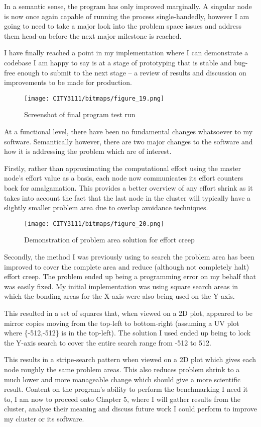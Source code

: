 In a semantic sense, the program has only improved marginally. A singular node is now once again capable of running the process single-handedly, however I am going to need to take a major look into the problem space issues and address them head-on before the next major milestone is reached.

\textbf{}

I have finally reached a point in my implementation where I can demonstrate a codebase I am happy to say is at a stage of prototyping that is stable and bug-free enough to submit to the next stage -- a review of results and discussion on improvements to be made for production.

\begin{figure}[H]
    \texttt{[image: CITY3111/bitmaps/figure\_19.png]}
    \caption{Screenshot of final program test run}
    \label{figure_19}
\end{figure}

At a functional level, there have been no fundamental changes whatsoever to my software. Semantically however, there are two major changes to the software and how it is addressing the problem which are of interest.

Firstly, rather than approximating the computational effort using the master node's effort value as a basis, each node now communicates its effort counters back for amalgamation. This provides a better overview of any effort shrink as it takes into account the fact that the last node in the cluster will typically have a slightly smaller problem area due to overlap avoidance techniques.

\begin{figure}[H]
    \texttt{[image: CITY3111/bitmaps/figure\_20.png]}
    \caption{Demonstration of problem area solution for effort creep}
    \label{figure_20}
\end{figure}

Secondly, the method I was previously using to search the problem area has been improved to cover the complete area and reduce (although not completely halt) effort creep. The problem ended up being a programming error on my behalf that was easily fixed. My initial implementation was using square search areas in which the bonding areas for the X-axis were also being used on the Y-axis.

This resulted in a set of squares that, when viewed on a 2D plot, appeared to be mirror copies moving from the top-left to bottom-right (assuming a UV plot where \{-512,-512\} is in the top-left). The solution I used ended up being to lock the Y-axis search to cover the entire search range from -512 to 512.

This results in a stripe-search pattern when viewed on a 2D plot which gives each node roughly the same problem areas. This also reduces problem shrink to a much lower and more manageable change which should give a more scientific result. Content on the program's ability to perform the benchmarking I need it to, I am now to proceed onto Chapter 5, where I will gather results from the cluster, analyse their meaning and discuss future work I could perform to improve my cluster or its software.
